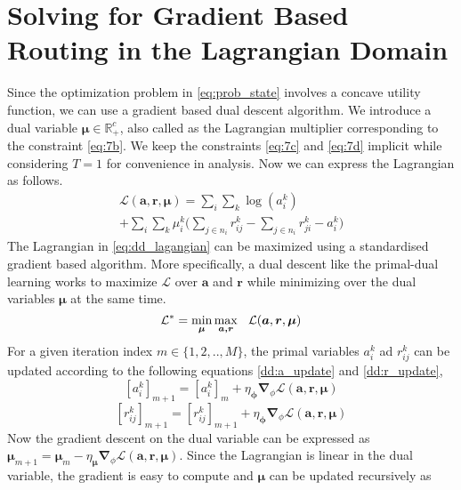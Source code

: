 \documentclass[lettersize,journal]{IEEEtran}
\begin{document}
\section{Solving for Gradient Based Routing in the Lagrangian Domain} \label{sec:dual_desc}
Since the optimization problem in \eqref{eq:prob_state} involves a concave utility function, we can use a gradient based dual descent algorithm. We introduce a dual variable $\bm{\mu} \in \mathbb{R}_+^c$, also called as the Lagrangian multiplier corresponding to the constraint \eqref{eq:7b}. We keep the constraints \eqref{eq:7c} and \eqref{eq:7d} implicit while considering $T=1$ for convenience in analysis. Now we can express the Lagrangian as follows.
\begin{multline} \label{eq:dd_lagangian}
    \mathcal{L} (\bm{a, r, \mu}) = \sum_i \sum_k \log ( a_i^k ) \\
    + \sum_i \sum_k \mu_i^k \Bigg( \sum_{j \in n_i} r_{ij}^k - \sum_{j \in n_i} r_{ji}^k - a_i^k\Bigg)
\end{multline}
The Lagrangian in \eqref{eq:dd_lagangian} can be maximized using a standardised gradient based algorithm. More specifically, a dual descent like the primal-dual learning works to maximize $\mathcal{L}$ over $\bm{a}$ and $\bm{r}$ while minimizing over the dual variables $\bm{\mu}$ at the same time.
\begin{equation} \label{eq:dd_lag_update}
    \mathcal{L}^* = \min_{\bm{\mu}} \max_{\bm{a,r}} \hspace{0.25cm} \mathcal{L}(\bm{a}, \bm{r}, \bm{\mu})
\end{equation}
For a given iteration index $m \in \{1,2,..,M\}$, the primal variables $a_i^k$ ad $r_{ij}^k$ can be updated according to the following equations \eqref{dd:a_update} and \eqref{dd:r_update},
\begin{equation} \label{dd:a_update}
    [{a_i^k}]_{m+1} = [{a_i^k}]_{m} + \eta_{\bm{\phi}} \bm{\nabla}_{\phi} \mathcal{L} (\bm{a, r, \mu})
\end{equation}
\begin{equation} \label{dd:r_update}
    [{r_{ij}^k}]_{m+1} = [{r_{ij}^k}]_{m+1} + \eta_{\bm{\phi}} \bm{\nabla}_{\phi} \mathcal{L} (\bm{a, r, \mu})
\end{equation}
Now the gradient descent on the dual variable can be expressed as $\bm{\mu}_{m+1} =  \bm{\mu}_m - \eta_{\bm{\mu}} \bm{\nabla}_{\phi} \mathcal{L} (\bm{a, r, \mu})$. Since the Lagrangian is linear in the dual variable, the gradient is easy to compute and $\bm{\mu}$ can be updated recursively as 
\end{document}
